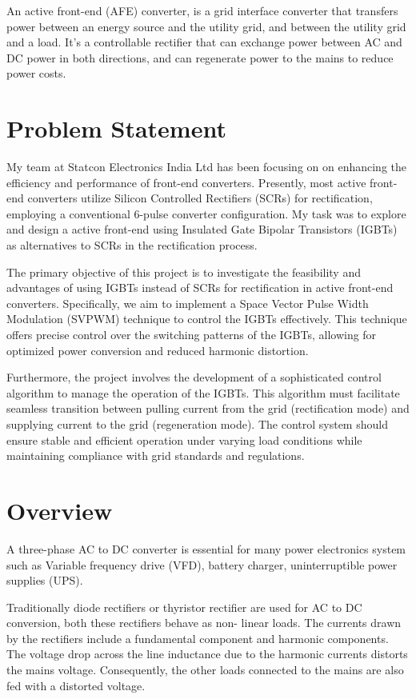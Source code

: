 An active front-end (AFE) converter, is a grid interface converter that
transfers power between an energy source and the utility grid, and between the
utility grid and a load. It's a controllable rectifier that can exchange power
between AC and DC power in both directions, and can regenerate power to the
mains to reduce power costs.
\section{Problem Statement}
My team at Statcon Electronics India Ltd has been focusing on on enhancing the
efficiency and performance of front-end converters. Presently, most active
front-end converters utilize Silicon Controlled Rectifiers (SCRs) for
rectification, employing a conventional 6-pulse converter configuration. My
task was to explore and design a active front-end using Insulated Gate Bipolar
Transistors (IGBTs) as alternatives to SCRs in the rectification process.

The primary objective of this project is to investigate the feasibility and
advantages of using IGBTs instead of SCRs for rectification in active front-end
converters. Specifically, we aim to implement a Space Vector Pulse Width
Modulation (SVPWM) technique to control the IGBTs effectively. This technique
offers precise control over the switching patterns of the IGBTs, allowing for
optimized power conversion and reduced harmonic distortion.

Furthermore, the project involves the development of a sophisticated control
algorithm to manage the operation of the IGBTs. This algorithm must facilitate
seamless transition between pulling current from the grid (rectification mode)
and supplying current to the grid (regeneration mode). The control system
should ensure stable and efficient operation under varying load conditions
while maintaining compliance with grid standards and regulations.

\section{Overview}
A three-phase AC to DC converter is essential for many power electronics system
such as Variable frequency drive (VFD), battery charger, uninterruptible power
supplies (UPS).

Traditionally diode rectifiers or thyristor rectifier are used for AC to DC
conversion, both these rectifiers behave as non- linear loads. The currents
drawn by the rectifiers include a fundamental component and harmonic
components. The voltage drop across the line inductance due to the harmonic
currents distorts the mains voltage. Consequently, the other loads connected to
the mains are also fed with a distorted voltage.

